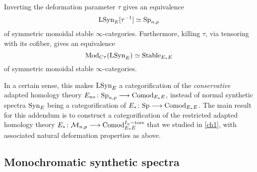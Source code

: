 \begin{theorem}
    \label{ch3:add:thm:deformation-properties-of-syn}
    Inverting the deformation parameter $\tau$ gives an equivalence 
    \[\mathrm{LSyn}_{E}[\tau^{-1}]\simeq \mathrm{Sp}_{n,p}\]
    of symmetric monoidal stable $\infty$-categories. Furthermore, killing $\tau$, via tensoring with its cofiber, gives an equivalence 
    \[\mathrm{Mod}_{C\tau}(\mathrm{LSyn}_{E})\simeq \mathrm{Stable}_{E_*E}\]
    of symmetric monoidal stable $\infty$-categories. 
\end{theorem}

In a certain sense, this makes $\mathrm{LSyn}_{E}$ a categorification of the \emph{conservative} adapted homology theory $E_{n*}\colon \mathrm{Sp}_{n,p}\longrightarrow \mathrm{Comod}_{E_*E}$, instead of normal synthetic spectra $\mathrm{Syn}_{E}$ being a categorification of $E_* \colon \mathrm{Sp}\longrightarrow \mathrm{Comod}_{E_*E}$. The main result for this addendum is to construct a categorification of the restricted adapted homology theory $E_{*}\colon \mathcal{M}_{n,p} \longrightarrow \mathrm{Comod}_{E_*E}^{I_n-\mathrm{tors}}$ that we studied in \cref{ch1}, with associated natural deformation properties as above. 










\subsection{Monochromatic synthetic spectra}

